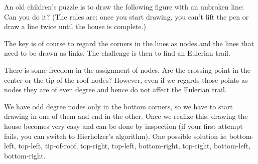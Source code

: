
An old children's puzzle is to draw the following figure with an unbroken line:
Can you do it? (The rules are: once you start drawing, you can't lift the pen or draw a line twice until the house is complete.)
 
\solution
The key is of course to regard the corners in the lines as nodes and the lines that need to be drawn as links. The challenge is then to find an Eulerian trail.  

There is some freedom in the assignment of nodes. Are the crossing point in the center or the tip of the roof nodes? However, even if we regards those points as nodes they are of even degree and hence do not affect the Eulerian trail. 

We have odd degree nodes only in the bottom corners, so we have to start drawing in one of them and end in the other. Once we realize this, drawing the house becomes very easy and can be done by inspection (if your first attempt fails, you can switch to Hierholzer's algorithm). One possible solution is: bottom-left, top-left, tip-of-roof, top-right, top-left, bottom-right, top-right, bottom-left, bottom-right.
